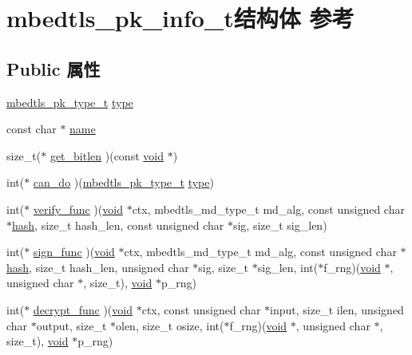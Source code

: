 \hypertarget{structmbedtls__pk__info__t}{}\section{mbedtls\+\_\+pk\+\_\+info\+\_\+t结构体 参考}
\label{structmbedtls__pk__info__t}
\subsection*{Public 属性}
\begin{DoxyCompactItemize}
\item 
\hyperlink{pk_8h_a3fe41eff5605ae727eb9d28dad297020}{mbedtls\+\_\+pk\+\_\+type\+\_\+t} \hyperlink{structmbedtls__pk__info__t_a1290aa516e4b5889952f56edf331c313}{type}
\item 
const char $\ast$ \hyperlink{structmbedtls__pk__info__t_a6390c0e7c7597efec2033fcbea53697c}{name}
\item 
size\+\_\+t($\ast$ \hyperlink{structmbedtls__pk__info__t_ab024ac521ddf1ea0837df0a88a0a4e19}{get\+\_\+bitlen} )(const \hyperlink{interfacevoid}{void} $\ast$)
\item 
int($\ast$ \hyperlink{structmbedtls__pk__info__t_af64d12bcc605260ebfbd24a8c6258e1f}{can\+\_\+do} )(\hyperlink{pk_8h_a3fe41eff5605ae727eb9d28dad297020}{mbedtls\+\_\+pk\+\_\+type\+\_\+t} \hyperlink{structmbedtls__pk__info__t_a1290aa516e4b5889952f56edf331c313}{type})
\item 
int($\ast$ \hyperlink{structmbedtls__pk__info__t_aba8b768e152806bc28322004a522dc0c}{verify\+\_\+func} )(\hyperlink{interfacevoid}{void} $\ast$ctx, mbedtls\+\_\+md\+\_\+type\+\_\+t md\+\_\+alg, const unsigned char $\ast$\hyperlink{structhash}{hash}, size\+\_\+t hash\+\_\+len, const unsigned char $\ast$sig, size\+\_\+t sig\+\_\+len)
\item 
int($\ast$ \hyperlink{structmbedtls__pk__info__t_a22d9de47693a6f2368d66d7d66db8093}{sign\+\_\+func} )(\hyperlink{interfacevoid}{void} $\ast$ctx, mbedtls\+\_\+md\+\_\+type\+\_\+t md\+\_\+alg, const unsigned char $\ast$\hyperlink{structhash}{hash}, size\+\_\+t hash\+\_\+len, unsigned char $\ast$sig, size\+\_\+t $\ast$sig\+\_\+len, int($\ast$f\+\_\+rng)(\hyperlink{interfacevoid}{void} $\ast$, unsigned char $\ast$, size\+\_\+t), \hyperlink{interfacevoid}{void} $\ast$p\+\_\+rng)
\item 
int($\ast$ \hyperlink{structmbedtls__pk__info__t_a32ef1fda6aedac78d5a28af612531162}{decrypt\+\_\+func} )(\hyperlink{interfacevoid}{void} $\ast$ctx, const unsigned char $\ast$input, size\+\_\+t ilen, unsigned char $\ast$output, size\+\_\+t $\ast$olen, size\+\_\+t osize, int($\ast$f\+\_\+rng)(\hyperlink{interfacevoid}{void} $\ast$, unsigned char $\ast$, size\+\_\+t), \hyperlink{interfacevoid}{void} $\ast$p\+\_\+rng)

\end{DoxyCompactItemize}

